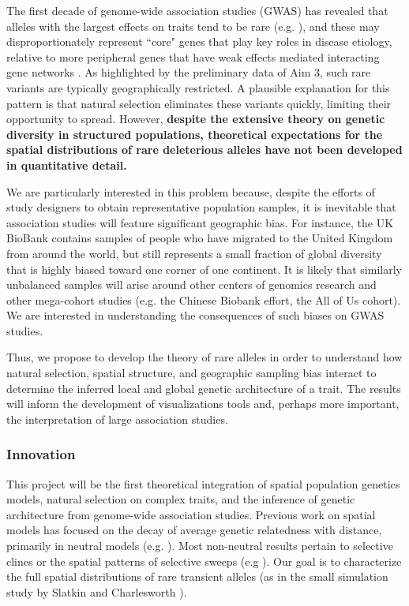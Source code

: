 \documentclass[SpecificAims_and_Proposal]{subfiles}
\begin{document}
The first decade of genome-wide association studies (GWAS) has revealed that alleles with the largest effects on traits tend to be rare (e.g. \citep{Marouli:2017aa}), and these may disproportionately represent ``core" genes that play key roles in disease etiology, relative to more peripheral genes that have weak effects mediated interacting gene networks \citep{Boyle:2017aa}.  As highlighted by the preliminary data of Aim 3, such rare variants are typically geographically restricted.  A plausible explanation for this pattern is that natural selection eliminates these variants quickly, limiting their opportunity to spread.  However, \textbf{despite the extensive theory on genetic diversity in structured populations, theoretical expectations for the spatial distributions of rare deleterious alleles have not been developed in quantitative detail.}

We are particularly interested in this problem because, despite the efforts of study designers to obtain representative population samples, it is inevitable that association studies will feature significant geographic bias.  For instance, the UK BioBank contains samples of people who have migrated to the United Kingdom from around the world, but still represents a small fraction of global diversity that is highly biased toward one corner of one continent.  It is likely that similarly unbalanced samples will arise around other centers of genomics research and other mega-cohort studies (e.g. the Chinese Biobank effort, the All of Us cohort).  We are interested in understanding the consequences of such biases on GWAS studies.

Thus, we propose to develop the theory of rare alleles in order to understand
how natural selection, spatial structure, and geographic sampling bias interact
to determine the inferred local and global genetic architecture of a trait.  The results will inform the development of visualizations tools and, perhaps more important, the interpretation of large association studies.

\subsubsection*{Innovation}\label{innovation}

This project will be the first theoretical integration of spatial population genetics models, natural selection on complex
traits, and the inference of genetic architecture from genome-wide
association studies. Previous work on spatial models has focused on the decay of average genetic relatedness with distance, primarily in neutral models
(e.g. \cite{Kimura1964, Malecot1975, Barbujani1987, Barton2002}).
Most non-neutral results pertain to selective clines \cite{Slatkin1973, Felsenstein1975, Nagylaki1978}
or the spatial patterns of selective sweeps (e.g \cite{Ralph2010}).
Our goal is to characterize the full spatial distributions of rare transient alleles (as in the small simulation study by Slatkin and Charlesworth \cite{Slatkin1978}).
\end{document}
